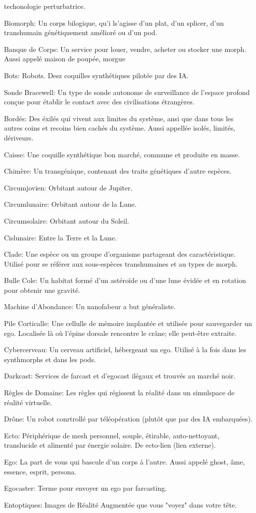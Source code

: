 techonologie perturbatrice. \item Biomorph: Un corps bilogique, qu'i ls'agisse d'un plat, d'un splicer, d'un transhumain génétiquement amélioré ou d'un pod. \item Banque de Corps: Un service pour louer, vendre, acheter  ou stocker une morph. Aussi appelé maison de poupée, morgue \item Bots: Robots. Desz coquilles synthétiques pilotée par des IA. \item Sonde Bracewell: Un type de sonde autonome de surveillance de l'espace profond conçue pour établir le contact avec des civilisations étrangères. \item Bordés: Des éxilés qui vivent aux limites du système, ansi que dans tous les autres coins et recoins bien cachés du système. Aussi appellée isolés, limités, dériveurs. \item Caisse: Une coquille synthétique bon marché, commune et produite en masse. \item Chimère: Un transgénique, contenant des traits génétiques d'autre espèces. \item Circumjovien: Orbitant autour de Jupiter. \item Circumlunaire: Orbitant autour de la Lune. \item Circumsolaire: Orbitant autour du Soleil. \item Cislunaire: Entre la Terre et la Lune. \item Clade: Une espèce ou un groupe d'organisme partageant des caractéristique. Utilisé pour se référer aux sous-espèces transhumaines et au types de morph. \item Bulle Cole: Un habitat formé d'un astéroïde ou d'une lune évidée et en rotation pour obtenir une gravité. \item Machine d'Abondance: Un nanofabeur a but généraliste. \item Pile Corticalle: Une cellulle de mémoire implantée et utilisée pour sauvegarder un ego. Localisée là où l'épine dorsale rencontre le crâne; elle peut-être extraite. \item Cybercerveau: Un cerveau artificiel, hébergeant un ego. Utilisé à la fois dans les synthmorphs et dans les pods. \item Darkcast: Services de farcast et d'egocast ilégaux et trouvés au marché noir. \item Règles de Domaine: Les règles qui régissent la réalité dans un simulspace de réalité virtuelle. \item Drône: Un robot conrtrollé par téléopération (plutôt que par des IA embarquées). \item Ecto: Périphérique de mesh personnel, souple, étirable, auto-nettoyant, translucide et alimenté par énergie solaire. De ecto-lien (lien externe). \item Ego: La part de vous qui bascule d'un corps à l'autre. Aussi appelé ghost, âme, essence, esprit, persona. \item Egocaster: Terme pour envoyer un ego par farcasting. \item Entoptiques: Images de Réalité Augmentée que vous "voyez" dans votre tête. 